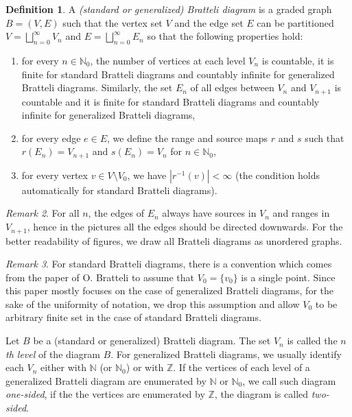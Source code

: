 \documentclass[11pt, twoside]{amsart}
\theoremstyle{definition}
\newtheorem{definition}{Definition}[section]
\theoremstyle{remark}
\newtheorem{remark}[definition]{Remark}
\theoremstyle{plain}
\newcommand{\N}{\mathbb N}
\newcommand{\Z}{\mathbb Z}
\numberwithin{equation}{section}
\begin{document}
\begin{definition}\label{Def:generalized_BD} A 
\textit{(standard or generalized) Bratteli diagram} is a graded graph 
$B = (V, E)$ such that the 
vertex set $V$ and the edge set $E$ can be partitioned $V = \bigsqcup_{n=0}^\infty  V_n$ and $E = 
\bigsqcup_{n=0}^\infty  E_n$ so that the following 
properties hold: 

\begin{enumerate}[label=\upshape(\roman*), leftmargin=*, widest=iii]

\item for every $n \in \mathbb{N}_0$, the number of vertices at each level 
$V_n$ is countable, it is finite for standard Bratteli diagrams and countably infinite for generalized Bratteli diagrams. Similarly, the set $E_n$
of all edges between $V_n$ and $V_{n+1}$ is countable and it is finite for standard Bratteli diagrams and countably infinite for generalized Bratteli diagrams,

\item for every edge $e\in E$, we define the 
range and 
source maps $r$ and $s$ such that $r(E_n) = V_{n+1}$ and 
$s(E_n) = V_{n}$ for $n \in \N_0$,

\item for every vertex $v \in V \setminus V_0$, we 
have $|r^{-1}(v)| < \infty$ (the condition holds automatically for standard Bratteli diagrams).
\end{enumerate}
\end{definition} 



\begin{remark}
For all $n$, the edges of $E_n$ always have sources in $V_{n}$ and ranges in $V_{n+1}$, hence in the pictures all the edges should be directed downwards. For the better readability of figures, we draw all Bratteli diagrams as unordered graphs.
\end{remark}

\begin{remark}
    For standard Bratteli diagrams, there is a convention which comes from the paper of O. Bratteli \cite{Bratteli1972} to assume that $V_0 = \{v_0\}$ is a single point. Since this paper mostly focuses on the case of generalized Bratteli diagrams, for the sake of the uniformity of notation, we drop this assumption and allow $V_0$ to be arbitrary finite set in the case of standard Bratteli diagrams. 
\end{remark}

Let $B$ be a (standard or generalized) Bratteli diagram.
The set $V_n$ is called the \textit{$n$th level} of the diagram $B$. For generalized Bratteli diagrams, we usually identify each $V_n$ either with $\N$ (or $\N_0$) or with $\Z$. If the vertices of each level of a generalized Bratteli diagram are enumerated by $\N$ or $\N_0$, we call such diagram \textit{one-sided}, if the the vertices are enumerated by $\Z$, the diagram is called \textit{two-sided}. 
\end{document}
